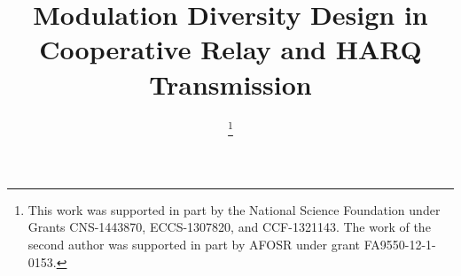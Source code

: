 \documentclass[journal]{IEEEtran}
\begin{document}
%
\title{Modulation Diversity Design in Cooperative Relay and HARQ Transmission}


\author{
    \thanks{This work was supported in part by the National Science Foundation
        under Grants CNS-1443870, ECCS-1307820, and CCF-1321143. The work of the
        second author was supported in part by AFOSR under grant FA9550-12-1-0153.
    }%
}


% 







\maketitle
\end{document}
